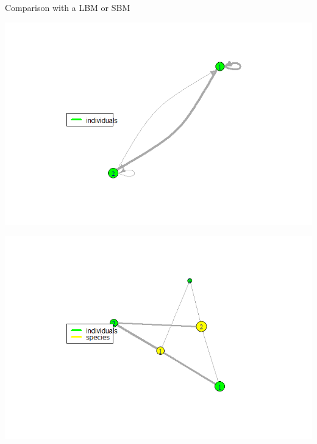 \documentclass[compress,10pt]{beamer}
\begin{document}
\begin{frame}{Comparison with a LBM or SBM}


 \centering  

\hspace{-3em}
\begin{minipage}[c]{.46\linewidth}
     \includegraphics[width = 1.5 \linewidth]{plots/res_MIRES_SBM_individuals.png}
\end{minipage} \hfill
   \begin{minipage}[c]{.46\linewidth}
 \includegraphics[width = 1.5\linewidth]{plots/res_MIRES_species.png}
   \end{minipage}
   
 \centering  
 \end{frame}
    
\end{document}
